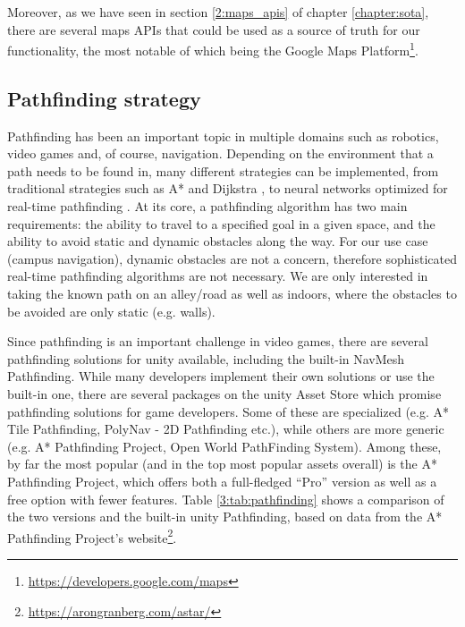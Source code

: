         Moreover, as we have seen in section \ref{2:maps_apis} of chapter \ref{chapter:sota}, there are several maps APIs that could be used as a source of truth for our functionality, the most notable of which being the Google Maps Platform\footnote{\url{https://developers.google.com/maps}}.

    \newpage
    
    \subsection{Pathfinding strategy}
    
        Pathfinding has been an important topic in multiple domains such as robotics, video games and, of course, navigation. Depending on the environment that a path needs to be found in, many different strategies can be implemented, from traditional strategies such as A* and Dijkstra \cite{graham2003pathfinding}, to neural networks optimized for real-time pathfinding \cite{graham2004neural}. At its core, a pathfinding algorithm has two main requirements: the ability to travel to a specified goal in a given space, and the ability to avoid static and dynamic obstacles along the way. For our use case (campus navigation), dynamic obstacles are not a concern, therefore sophisticated real-time pathfinding algorithms are not necessary. We are only interested in taking the known path on an alley/road as well as indoors, where the obstacles to be avoided are only static (e.g. walls).
    
        Since pathfinding is an important challenge in video games, there are several pathfinding solutions for \gls{unity} available, including the built-in NavMesh Pathfinding. While many developers implement their own solutions or use the built-in one, there are several packages on the \gls{unity} Asset Store which promise pathfinding solutions for game developers. Some of these are specialized (e.g. A* Tile Pathfinding, PolyNav - 2D Pathfinding etc.), while others are more generic (e.g. A* Pathfinding Project, Open World PathFinding System). Among these, by far the most popular (and in the top most popular assets overall) is the A* Pathfinding Project, which offers both a full-fledged “Pro” version as well as a free option with fewer features. Table \ref{3:tab:pathfinding} shows a comparison of the two versions and the built-in \gls{unity} Pathfinding, based on data from the A* Pathfinding Project's website\footnote{\url{https://arongranberg.com/astar/}}.
        

